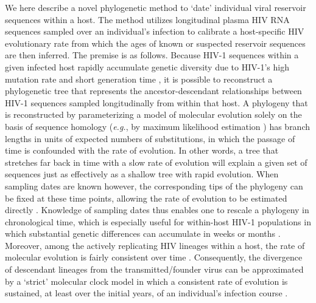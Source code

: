 \documentclass[12pt]{article}
\begin{document}
We here describe a novel phylogenetic method to `date' individual viral reservoir sequences within a host.
The method utilizes longitudinal plasma HIV RNA sequences sampled over an individual's infection to calibrate a host-specific HIV evolutionary rate from which the ages of known or suspected reservoir sequences are then inferred. The premise is as follows.
Because HIV-1 sequences within a given infected host rapidly accumulate genetic diversity due to HIV-1's high mutation rate and short generation time \cite{Alizon13,Rambaut04,Shankarappa99}, it is possible to reconstruct a phylogenetic tree that represents the ancestor-descendant relationships between HIV-1 sequences sampled longitudinally from within that host.
A phylogeny that is reconstructed by parameterizing a model of molecular evolution solely on the basis of sequence homology (\emph{e.g.}, by maximum likelihood estimation \cite{Felsenstein81}) has branch lengths in units of expected numbers of substitutions, in which the passage of time is confounded with the rate of evolution.
In other words, a tree that stretches far back in time with a slow rate of evolution will explain a given set of sequences just as effectively as a shallow tree with rapid evolution.
When sampling dates are known however, the corresponding tips of the phylogeny can be fixed at these time points, allowing the rate of evolution to be estimated directly \cite{Rodrigo99}.
Knowledge of sampling dates thus enables one to rescale a phylogeny in chronological time, which is especially useful for within-host HIV-1 populations in which substantial genetic differences can accumulate in weeks or months \cite{Williamson03}.
Moreover, among the actively replicating HIV lineages within a host, the rate of molecular evolution is fairly consistent over time \cite{Korber00,Kuhner95,Leitner99}.
Consequently, the divergence of descendant lineages from the transmitted/founder virus can be approximated by a `strict' molecular clock model in which a consistent rate of evolution is sustained, at least over the initial years, of an individual's infection course \cite{Keele08}. 
\end{document}
